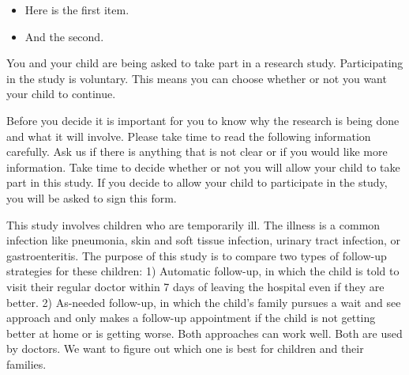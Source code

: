 \documentclass[11pt]{article}
\begin{document}
\begin{itemize} 
\item Here is the first item.
\item And the second.
\end{itemize} 

You and your child are being asked to take part in a research study. Participating in the study is voluntary. This means you can choose whether or not you want your child to continue. 

Before you decide it is important for you to know why the research is being done and what it will involve. Please take time to read the following information carefully. Ask us if there is anything that is not clear or if you would like more information. 
Take time to decide whether or not you will allow your child to take part in this study. If you decide to allow your child to participate in the study, you will be asked to sign this form.

This study involves children who are temporarily ill. The illness is a common infection like pneumonia, skin and soft tissue infection, urinary tract infection, or gastroenteritis.  The purpose of this study is to compare two types of follow-up strategies for these children: 1) Automatic follow-up, in which the child is told to visit their regular doctor within 7 days of leaving the hospital even if they are better. 2) As-needed follow-up, in which the child's family pursues a wait and see approach and only makes a follow-up appointment if the child is not getting better at home or is getting worse. Both approaches can work well. Both are used by doctors.  We want to figure out which one is best for children and their families.
\end{document}
